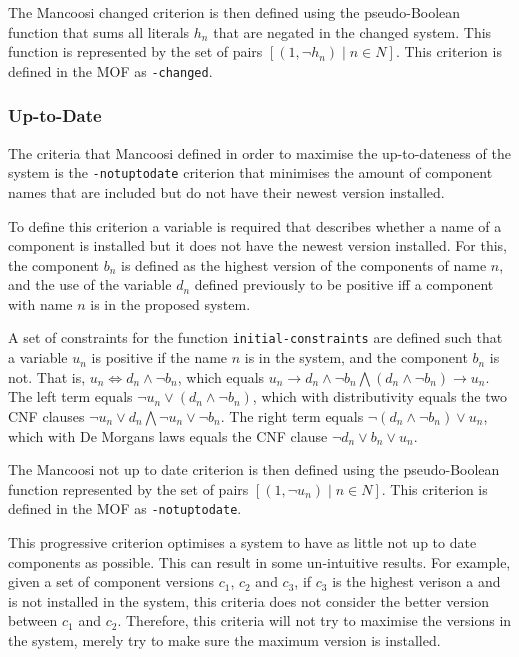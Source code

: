 \begin{defs}
The Mancoosi changed criterion is then defined using the pseudo-Boolean function
that sums all literals $h_n$ that are negated in the changed system. 
This function is represented by the set of pairs $[(1,\neg h_n) \mid n \in N]$.
This criterion is defined in the MOF as \verb+-changed+.
\end{defs}

\subsubsection{Up-to-Date}
The criteria that Mancoosi defined in order to maximise the up-to-dateness of the system is the \verb+-notuptodate+ 
criterion that minimises the amount of component names that are included but do not have their newest version installed.

To define this criterion a variable is required that describes whether a name of a component is installed but it does not have the newest version installed.
For this, the component $b_n$ is defined as the highest version of the components of name $n$,
and the use of the variable $d_n$ defined previously to be positive iff a component with name $n$ is in the proposed system.

A set of constraints for the function \verb+initial-constraints+ are defined
such that a variable $u_n$ is positive if the name $n$ is in the system, and the component $b_n$ is not.
That is, $u_n \Leftrightarrow d_n \wedge \neg b_n$, which equals
$u_n \rightarrow d_n \wedge \neg b_n \bigwedge (d_n \wedge \neg b_n) \rightarrow u_n$.
The left term equals $\neg u_n \vee (d_n \wedge \neg b_n)$, 
which with distributivity equals the two CNF clauses $\neg u_n \vee d_n \bigwedge \neg u_n \vee \neg b_n$.
The right term equals $\neg (d_n \wedge \neg b_n) \vee u_n$,
which with De Morgans laws equals the CNF clause $\neg d_n \vee b_n \vee u_n$. 

\begin{defs}
The Mancoosi not up to date criterion is then defined using the pseudo-Boolean function
represented by the set of pairs $[(1,\neg u_n) \mid n \in N]$.
This criterion is defined in the MOF as \verb+-notuptodate+.
\end{defs}


This progressive criterion optimises a system to have as little not up to date components as possible.
This can result in some un-intuitive results.
For example, given a set of component versions $c_1$, $c_2$ and $c_3$, if $c_3$ is the highest verison a and is not installed in the system, 
this criteria does not consider the better version between $c_1$ and $c_2$.
Therefore, this criteria will not try to maximise the versions in the system, merely try to make sure the maximum version is installed.

